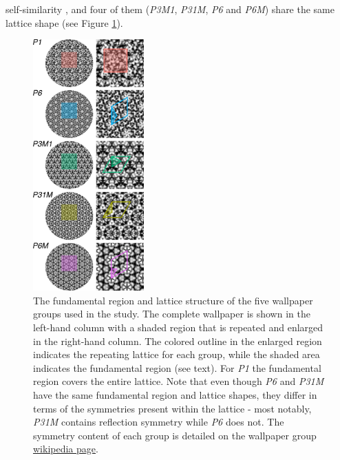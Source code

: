 \documentclass[11pt, twoside]{article}
\begin{document}
self-similarity \citep{RN172}, and four of them (\textit{P3M1}, \textit{P31M}, \textit{P6} and \textit{P6M}) share the same lattice shape (see Figure \ref{fig:wpg_structure}). 

\begin{figure}[H]
	\centering
	\includegraphics[width=0.38\textwidth]{./figures/wpg_structure.pdf}
	\caption{The fundamental region and lattice structure of the five wallpaper groups used in the study. The complete wallpaper is shown in the left-hand column with a shaded region that is repeated and enlarged in the right-hand column. The colored outline in the enlarged region indicates the repeating lattice for each group, while the shaded area indicates the fundamental region (see text). For \textit{P1} the fundamental region covers the entire lattice. Note that even though \textit{P6} and \textit{P31M} have the same fundamental region and lattice shapes, they differ in terms of the symmetries present within the lattice - most notably, \textit{P31M} contains reflection symmetry while \textit{P6} does not. The symmetry content of each group is detailed on the wallpaper group \href{https://en.wikipedia.org/wiki/Wallpaper_group}{wikipedia page}.}
	\label{fig:wpg_structure}
\end{figure}
\end{document}
